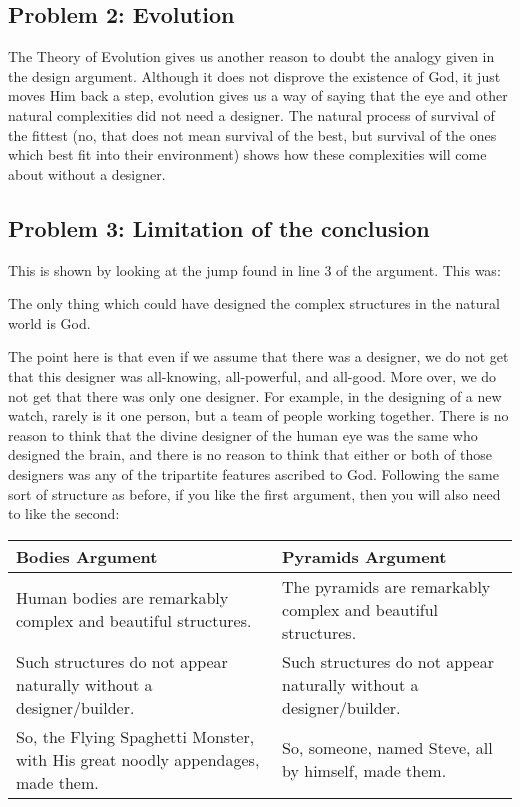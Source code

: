 \subsection{Problem 2: Evolution}

The Theory of Evolution gives us another reason to doubt the analogy given in the design argument. Although it does not disprove the existence of God, it just moves Him back a step, evolution gives us a way of saying that the eye and other natural complexities did not need a designer. The natural process of survival of the fittest (no, that does not mean survival of the best, but survival of the ones which best fit into their environment) shows how these complexities will come about without a designer.

\subsection{Problem 3: Limitation of the conclusion}

This is shown by looking at the jump found in line 3 of the argument. This was:

    \begin{center}The only thing which could have designed the complex structures in the natural world is God.\end{center}

The point here is that even if we assume that there was a designer, we do not get that this designer was all-knowing, all-powerful, and all-good. More over, we do not get that there was only one designer. For example, in the designing of a new watch, rarely is it one person, but a team of people working together. There is no reason to think that the divine designer of the human eye was the same who designed the brain, and there is no reason to think that either or both of those designers was any of the tripartite features ascribed to God. Following the same sort of structure as before, if you like the first argument, then you will also need to like the second:


\noindent
\begin{tabular}{p{2.75in}|p{2.75in}}
Bodies Argument&Pyramids Argument\\\hline
    Human bodies are remarkably complex and beautiful structures.&The pyramids are remarkably complex and beautiful structures.\\
    Such structures do not appear naturally without a designer/builder.&Such structures do not appear naturally without a designer/builder.\\
    So, the Flying Spaghetti Monster, with His great noodly appendages, made them.&So, someone, named Steve, all by himself, made them.
\end{tabular}

